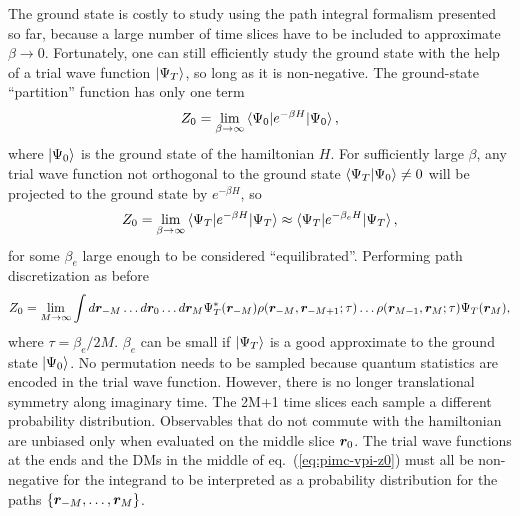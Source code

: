 The ground state is costly to study using the path integral formalism presented so far, because a large number of time slices have to be included to approximate $\beta\rightarrow0$. Fortunately, one can still efficiently study the ground state with the help of a trial wave function $\ket{\Psi_T}$, so long as it is non-negative. The ground-state ``partition'' function has only one term
\begin{align}
Z_0 = \lim\limits_{\beta\rightarrow\infty} \braket{\Psi_0|e^{-\beta H}|\Psi_0},
\end{align}
where $\ket{\Psi_0}$ is the ground state of the hamiltonian $H$.
For sufficiently large $\beta$, any trial wave function not orthogonal to the ground state $\braket{\Psi_T|\Psi_0}\neq0$ will be projected to the ground state by $e^{-\beta H}$, so
\begin{align}
Z_0 = \lim\limits_{\beta\rightarrow\infty}\braket{\Psi_T|e^{-\beta H}|\Psi_T} \approx \braket{\Psi_T|e^{-\beta_e H}|\Psi_T},
\end{align}
for some $\beta_e$ large enough to be considered ``equilibrated''. Performing path discretization as before
\begin{align} \label{eq:pimc-vpi-z0}
Z_0 = \lim\limits_{M\rightarrow\infty} \int d\boldsymbol{r}_{-M}\dots d\boldsymbol{r}_0\dots d\boldsymbol{r}_{M}
\Psi_T^*(\boldsymbol{r}_{-M})\rho(\boldsymbol{r}_{-M},\boldsymbol{r}_{-M+1};\tau)\dots\rho(\boldsymbol{r}_{M-1},\boldsymbol{r}_M;\tau)\Psi_T(\boldsymbol{r}_M),
\end{align}
where $\tau=\beta_e/2M$. $\beta_e$ can be small if $\ket{\Psi_T}$ is a good approximate to the ground state $\ket{\Psi_0}$. No permutation needs to be sampled because quantum statistics are encoded in the trial wave function. However, there is no longer translational symmetry along imaginary time. The 2M+1 time slices each sample a different probability distribution. Observables that do not commute with the hamiltonian are unbiased only when evaluated on the middle slice $\boldsymbol{r}_0$. The trial wave functions at the ends and the DMs in the middle of eq.~(\ref{eq:pimc-vpi-z0}) must all be non-negative for the integrand to be interpreted as a probability distribution for the paths $\{\boldsymbol{r}_{-M},\dots,\boldsymbol{r}_M\}$.

